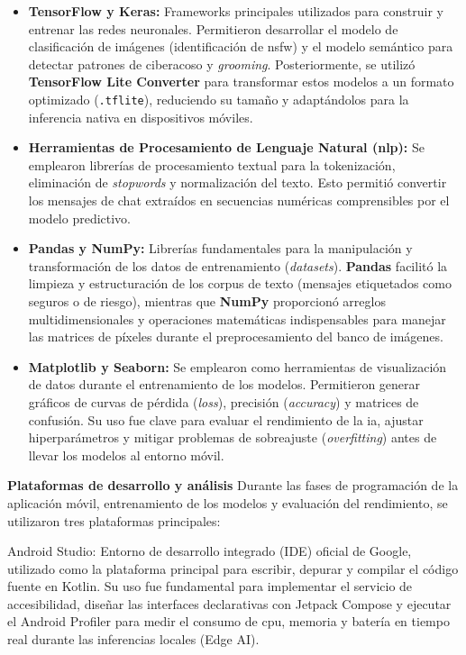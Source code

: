 \begin{itemize}
    \item \textbf{TensorFlow y Keras:} Frameworks principales utilizados para construir y entrenar las redes neuronales. Permitieron desarrollar el modelo de clasificación de imágenes (identificación de \gls{nsfw}) y el modelo semántico para detectar patrones de ciberacoso y \textit{grooming}. Posteriormente, se utilizó \textbf{TensorFlow Lite Converter} para transformar estos modelos a un formato optimizado (\texttt{.tflite}), reduciendo su tamaño y adaptándolos para la inferencia nativa en dispositivos móviles.

    \item \textbf{Herramientas de Procesamiento de Lenguaje Natural (\gls{nlp}):} Se emplearon librerías de procesamiento textual para la tokenización, eliminación de \textit{stopwords} y normalización del texto. Esto permitió convertir los mensajes de chat extraídos en secuencias numéricas comprensibles por el modelo predictivo.

    \item \textbf{Pandas y NumPy:} Librerías fundamentales para la manipulación y transformación de los datos de entrenamiento (\textit{datasets}). \textbf{Pandas} facilitó la limpieza y estructuración de los corpus de texto (mensajes etiquetados como seguros o de riesgo), mientras que \textbf{NumPy} proporcionó arreglos multidimensionales y operaciones matemáticas indispensables para manejar las matrices de píxeles durante el preprocesamiento del banco de imágenes.

    \item \textbf{Matplotlib y Seaborn:} Se emplearon como herramientas de visualización de datos durante el entrenamiento de los modelos. Permitieron generar gráficos de curvas de pérdida (\textit{loss}), precisión (\textit{accuracy}) y matrices de confusión. Su uso fue clave para evaluar el rendimiento de la \gls{ia}, ajustar hiperparámetros y mitigar problemas de sobreajuste (\textit{overfitting}) antes de llevar los modelos al entorno móvil.
\end{itemize}
\textbf{Plataformas de desarrollo y análisis}
Durante las fases de programación de la aplicación móvil, entrenamiento de los modelos y evaluación del rendimiento, se utilizaron tres plataformas principales:

Android Studio: Entorno de desarrollo integrado (IDE) oficial de Google, utilizado como la plataforma principal para escribir, depurar y compilar el código fuente en Kotlin. Su uso fue fundamental para implementar el servicio de accesibilidad, diseñar las interfaces declarativas con Jetpack Compose y ejecutar el Android Profiler para medir el consumo de \gls{cpu}, memoria y batería en tiempo real durante las inferencias locales (Edge AI).\\

